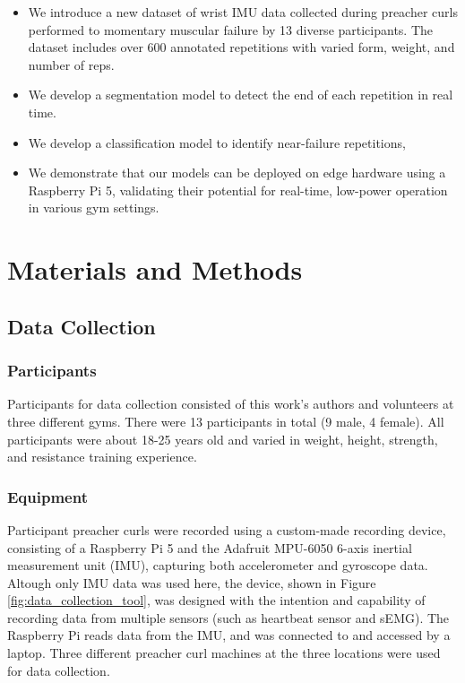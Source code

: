 \documentclass[conference]{IEEEtran}
\begin{document}
\begin{itemize}
    \item We introduce a new dataset of wrist IMU data collected during preacher curls performed to momentary muscular failure by 13 diverse participants. The dataset includes over 600 annotated repetitions with varied form, weight, and number of reps.
    \item We develop a segmentation model to detect the end of each repetition in real time.
    \item We develop a classification model to identify near-failure repetitions, 
    \item We demonstrate that our models can be deployed on edge hardware using a Raspberry Pi 5, validating their potential for real-time, low-power operation in various gym settings.
\end{itemize}


\section{Materials and Methods}
\subsection{Data Collection}
\subsubsection{Participants}
Participants for data collection consisted of this work's authors and volunteers at three different gyms. There were 13 participants in total (9 male, 4 female). All participants were about 18-25 years old and varied in weight, height, strength, and resistance training experience.

\subsubsection{Equipment}
Participant preacher curls were recorded using a custom-made recording device, consisting of a Raspberry Pi 5 and the Adafruit MPU-6050 6-axis inertial measurement unit (IMU), capturing both accelerometer and gyroscope data. Altough only IMU data was used here, the device, shown in Figure \ref{fig:data_collection_tool}, was designed with the intention and capability of recording data from multiple sensors (such as heartbeat sensor and sEMG). The Raspberry Pi reads data from the IMU, and was connected to and accessed by a laptop. Three different preacher curl machines at the three locations were used for data collection.
\end{document}
